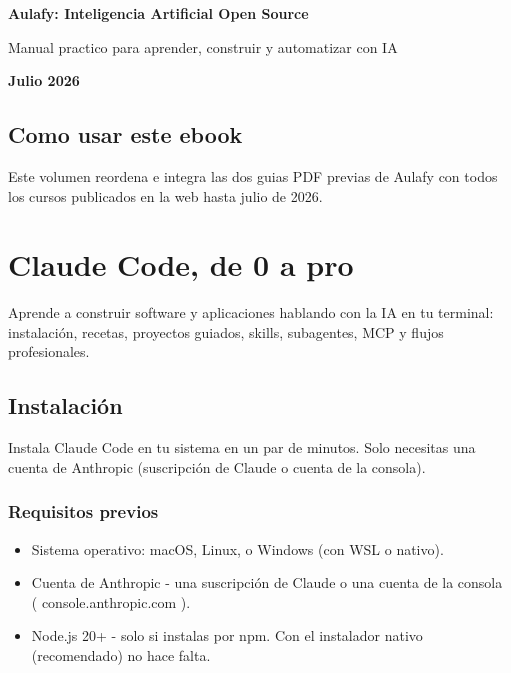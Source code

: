 \documentclass[11pt,a4paper]{book}
\begin{document}
\begin{titlepage}\centering\vspace*{25mm}
{\sffamily\bfseries\Huge Aulafy: Inteligencia Artificial Open Source\par}\vspace{7mm}
{\Large Manual practico para aprender, construir y automatizar con IA\par}\vspace{5mm}
{\sffamily\bfseries Julio 2026\par}\vfill
\end{titlepage}
\tableofcontents\clearpage
\chapter*{Como usar este ebook}
Este volumen reordena e integra las dos guias PDF previas de Aulafy con todos los cursos publicados en la web hasta julio de 2026.
\part{Claude Code, de 0 a pro}
Aprende a construir software y aplicaciones hablando con la IA en tu terminal: instalación, recetas, proyectos guiados, skills, subagentes, MCP y flujos profesionales.

\chapter{Instalación}
Instala Claude Code en tu sistema en un par de minutos. Solo necesitas una cuenta de Anthropic (suscripción de Claude o cuenta de la consola).

\section{Requisitos previos}
\begin{itemize}\item Sistema operativo: macOS, Linux, o Windows (con WSL o nativo).\end{itemize}
\begin{itemize}\item Cuenta de Anthropic - una suscripción de Claude o una cuenta de la consola ( console.anthropic.com ).\end{itemize}
\begin{itemize}\item Node.js 20+ - solo si instalas por npm. Con el instalador nativo (recomendado) no hace falta.\end{itemize}
\end{document}
